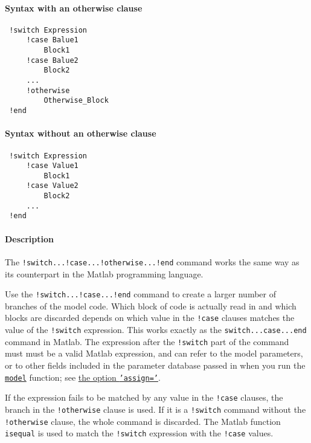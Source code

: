 


	\paragraph{Syntax with an otherwise clause}
 
 \begin{verbatim}
 !switch Expression
     !case Balue1
         Block1
     !case Balue2
         Block2
     ...
     !otherwise
         Otherwise_Block
 !end
 \end{verbatim}
 
 \paragraph{Syntax without an otherwise clause}
 
 \begin{verbatim}
 !switch Expression
     !case Value1
         Block1
     !case Value2
         Block2
     ...
 !end
 \end{verbatim}
 
 \paragraph{Description}
 
 The \texttt{!switch...!case...!otherwise...!end} command works the same
 way as its counterpart in the Matlab programming language.
 
 Use the \texttt{!switch...!case...!end} command to create a larger
 number of branches of the model code. Which block of code is actually
 read in and which blocks are discarded depends on which value in the
 \texttt{!case} clauses matches the value of the \texttt{!switch}
 expression. This works exactly as the \texttt{switch...case...end}
 command in Matlab. The expression after the \texttt{!switch} part of the
 command must must be a valid Matlab expression, and can refer to the
 model parameters, or to other fields included in the parameter database
 passed in when you run the \href{model/model}{\texttt{model}} function;
 see \href{model/model}{the option \texttt{'assign='}}.
 
 If the expression fails to be matched by any value in the \texttt{!case}
 clauses, the branch in the \texttt{!otherwise} clause is used. If it is
 a \texttt{!switch} command without the \texttt{!otherwise} clause, the
 whole command is discarded. The Matlab function \texttt{isequal} is used
 to match the \texttt{!switch} expression with the \texttt{!case} values.
 
